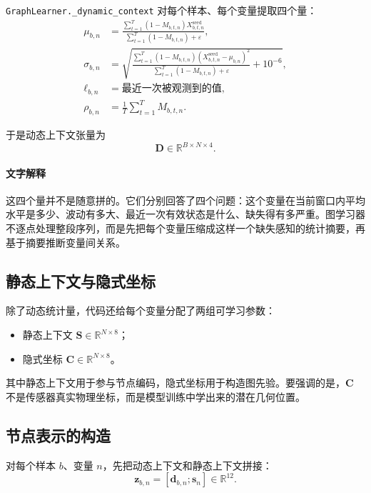 \documentclass[UTF8]{ctexart}
\begin{document}
\verb|GraphLearner._dynamic_context| 对每个样本、每个变量提取四个量：
\begin{align}
    \mu_{b,n} &= \frac{\sum_{t=1}^{T} (1-M_{b,t,n}) X^{\text{seed}}_{b,t,n}}{\sum_{t=1}^{T}(1-M_{b,t,n}) + \varepsilon}, \\
    \sigma_{b,n} &= \sqrt{
        \frac{\sum_{t=1}^{T}(1-M_{b,t,n})\left(X^{\text{seed}}_{b,t,n} - \mu_{b,n}\right)^2}
        {\sum_{t=1}^{T}(1-M_{b,t,n}) + \varepsilon}
        + 10^{-6}
    }, \\
    \ell_{b,n} &= \text{最近一次被观测到的值}, \\
    \rho_{b,n} &= \frac{1}{T}\sum_{t=1}^{T} M_{b,t,n}.
\end{align}

于是动态上下文张量为
\begin{equation}
    \bm{D} \in \mathbb{R}^{B \times N \times 4}.
\end{equation}

\paragraph{文字解释}
这四个量并不是随意拼的。它们分别回答了四个问题：这个变量在当前窗口内平均水平是多少、波动有多大、最近一次有效状态是什么、缺失得有多严重。图学习器不逐点处理整段序列，而是先把每个变量压缩成这样一个缺失感知的统计摘要，再基于摘要推断变量间关系。

\subsection{静态上下文与隐式坐标}

除了动态统计量，代码还给每个变量分配了两组可学习参数：
\begin{itemize}
    \item 静态上下文 \(\bm{S} \in \mathbb{R}^{N \times 8}\)；
    \item 隐式坐标 \(\bm{C} \in \mathbb{R}^{N \times 8}\)。
\end{itemize}

其中静态上下文用于参与节点编码，隐式坐标用于构造图先验。要强调的是，\(\bm{C}\) 不是传感器真实物理坐标，而是模型训练中学出来的潜在几何位置。

\subsection{节点表示的构造}

对每个样本 \(b\)、变量 \(n\)，先把动态上下文和静态上下文拼接：
\begin{equation}
    \bm{z}_{b,n} = [\bm{d}_{b,n}; \bm{s}_n] \in \mathbb{R}^{12}.
\end{equation}
\end{document}

